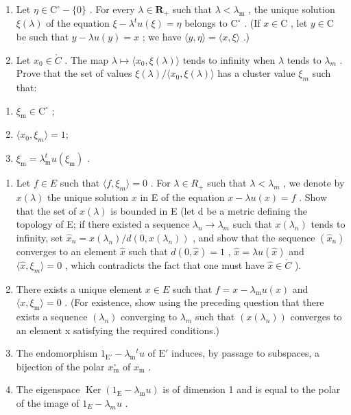 \begin{enumerate}
\def\labelenumi{\alph{enumi})}
\item
  Let \(\eta \in \mathrm{C}^{\circ} - \{0\}\) . For every \(\lambda \in \mathbf{R}_{+}\) such that \(\lambda < \lambda_{\mathrm{m}}\) , the unique solution \(\xi(\lambda)\) of the equation \(\xi - \lambda^{t}u(\xi) = \eta\) belongs to \(\mathrm{C}^{\circ}\) . (If \(x \in \mathrm{C}\) , let \(y \in \mathrm{C}\) be such that \(y - \lambda u(y) = x\) ; we have \(\langle y, \eta \rangle = \langle x, \xi \rangle\) .)
\item
  Let \(x_{0} \in \mathring{C}\) . The map \(\lambda \mapsto \langle x_{0}, \xi(\lambda) \rangle\) tends to infinity when \(\lambda\) tends to \(\lambda_{m}\) . Prove that the set of values \(\xi(\lambda)/\langle x_{0}, \xi(\lambda) \rangle\) has a cluster value \(\xi_{m}\) such that:
\end{enumerate}

\begin{enumerate}
\def\labelenumi{(\roman{enumi})}
\item
  \(\xi_{\mathrm{m}}\in \mathrm{C}^{\circ}\) ;
\item
  \(\langle x_{0},\xi_{m}\rangle=1;\)
\item
  \(\xi_{\mathrm{m}} = \lambda_{\mathrm{m}}^{t}u(\xi_{\mathrm{m}})\) .
\end{enumerate}

\begin{enumerate}
\def\labelenumi{\alph{enumi})}
\setcounter{enumi}{2}
\item
  Let \(f \in E\) such that \(\langle f, \xi_{m} \rangle = 0\) . For \(\lambda \in R_{+}\) such that \(\lambda < \lambda_{m}\) , we denote by \(x(\lambda)\) the unique solution \(x\) in E of the equation \(x - \lambda u(x) = f\) . Show that the set of \(x(\lambda)\) is bounded in E (let d be a metric defining the topology of E; if there existed a sequence \(\lambda_{n} \to \lambda_{m}\) such that \(x(\lambda_{n})\) tends to infinity, set \(\hat{x}_{n} = x(\lambda_{n}) / d(0, x(\lambda_{n}))\) , and show that the sequence \((\hat{x}_{n})\) converges to an element \(\hat{x}\) such that \(d(0, \hat{x}) = 1\) , \(\hat{x} = \lambda u(\hat{x})\) and \(\langle \hat{x}, \xi_{m} \rangle = 0\) , which contradicts the fact that one must have \(\hat{x} \in \mathring{C}\) ).
\item
  There exists a unique element \(x \in E\) such that \(f = x - \lambda_{\mathrm{m}} u(x)\) and \(\langle x, \xi_{\mathrm{m}} \rangle = 0\) . (For existence, show using the preceding question that there exists a sequence \((\lambda_{n})\) converging to \(\lambda_{m}\) such that \((x(\lambda_{n}))\) converges to an element x satisfying the required conditions.)
\item
  The endomorphism \(1_{\mathrm{E}'} - \lambda_{\mathrm{m}}{}^{t}u\) of \(\mathrm{E}'\) induces, by passage to subspaces, a bijection of the polar \(x_{\mathrm{m}}^{\circ}\) of \(x_{\mathrm{m}}\) .
\item
  The eigenspace \(\operatorname{Ker}(1_{\mathrm{E}} - \lambda_{\mathrm{m}}u)\) is of dimension 1 and is equal to the polar of the image of \(1_{E} - \lambda_{m}u\) .
\end{enumerate}


